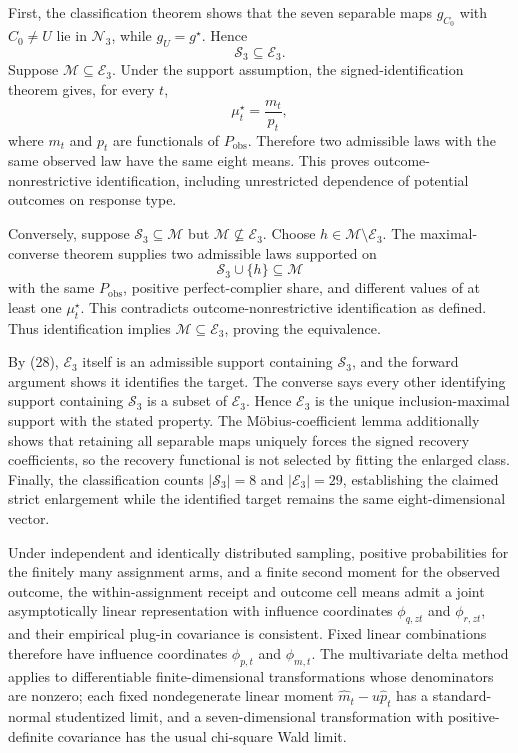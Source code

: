 First, the classification theorem shows that the seven separable maps \(g_{C_0}\) with \(C_0\ne U\) lie in \(\mathcal N_3\), while \(g_U=g^\star\).  Hence
\[
\mathcal S_3\subseteq\mathcal E_3. \tag{28}
\]
Suppose \(\mathcal M\subseteq\mathcal E_3\).  Under the support assumption, the signed-identification theorem gives, for every \(t\),
\[
\mu_t^\star=\frac{m_t}{p_t},
\]
where \(m_t\) and \(p_t\) are functionals of \(P_{\mathrm{obs}}\).  Therefore two admissible laws with the same observed law have the same eight means.  This proves outcome-nonrestrictive identification, including unrestricted dependence of potential outcomes on response type.

Conversely, suppose \(\mathcal S_3\subseteq\mathcal M\) but \(\mathcal M\not\subseteq\mathcal E_3\).  Choose \(h\in\mathcal M\setminus\mathcal E_3\).  The maximal-converse theorem supplies two admissible laws supported on
\[
\mathcal S_3\cup\{h\}\subseteq\mathcal M
\]
with the same \(P_{\mathrm{obs}}\), positive perfect-complier share, and different values of at least one \(\mu_t^\star\).  This contradicts outcome-nonrestrictive identification as defined.  Thus identification implies \(\mathcal M\subseteq\mathcal E_3\), proving the equivalence.

By (28), \(\mathcal E_3\) itself is an admissible support containing \(\mathcal S_3\), and the forward argument shows it identifies the target.  The converse says every other identifying support containing \(\mathcal S_3\) is a subset of \(\mathcal E_3\).  Hence \(\mathcal E_3\) is the unique inclusion-maximal support with the stated property.  The Möbius-coefficient lemma additionally shows that retaining all separable maps uniquely forces the signed recovery coefficients, so the recovery functional is not selected by fitting the enlarged class.  Finally, the classification counts \(|\mathcal S_3|=8\) and \(|\mathcal E_3|=29\), establishing the claimed strict enlargement while the identified target remains the same eight-dimensional vector.

Under independent and identically distributed sampling, positive probabilities for the finitely many assignment arms, and a finite second moment for the observed outcome, the within-assignment receipt and outcome cell means admit a joint asymptotically linear representation with influence coordinates \(\phi_{q,zt}\) and \(\phi_{r,zt}\), and their empirical plug-in covariance is consistent.  Fixed linear combinations therefore have influence coordinates \(\phi_{p,t}\) and \(\phi_{m,t}\).  The multivariate delta method applies to differentiable finite-dimensional transformations whose denominators are nonzero; each fixed nondegenerate linear moment \(\widehat m_t-u\widehat p_t\) has a standard-normal studentized limit, and a seven-dimensional transformation with positive-definite covariance has the usual chi-square Wald limit.

